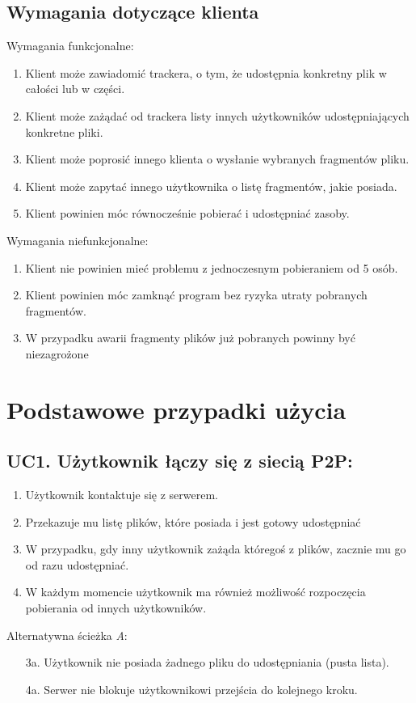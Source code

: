 \documentclass[11pt]{article}
\begin{document}
\subsection{Wymagania dotyczące klienta}
Wymagania funkcjonalne:
\begin{enumerate}
\item Klient może zawiadomić trackera, o tym, że udostępnia konkretny plik w całości lub w części.
\item Klient może zażądać od trackera listy innych użytkowników udostępniających konkretne pliki.
\item Klient może poprosić innego klienta o wysłanie wybranych fragmentów pliku.
\item Klient może zapytać innego użytkownika o listę fragmentów, jakie posiada.
\item Klient powinien móc równocześnie pobierać i udostępniać zasoby.
\end{enumerate}
Wymagania niefunkcjonalne:
\begin{enumerate}
\item Klient nie powinien mieć problemu z jednoczesnym pobieraniem od 5 osób.
\item Klient powinien móc zamknąć program bez ryzyka utraty pobranych fragmentów.
\item W przypadku awarii fragmenty plików już pobranych powinny być niezagrożone
\end{enumerate}

\section{Podstawowe przypadki użycia}
\subsection{UC1. Użytkownik łączy się z siecią P2P:}
\begin{enumerate}
	\item Użytkownik kontaktuje się z serwerem.
	\item Przekazuje mu listę plików, które posiada i jest gotowy udostępniać
	\item W przypadku, gdy inny użytkownik zażąda któregoś z plików, zacznie mu go od razu udostępniać.
	\item W każdym momencie użytkownik ma również możliwość rozpoczęcia pobierania od innych użytkowników.
\end{enumerate}
Alternatywna ścieżka \textsl{A}:
\begin{itemize}
	\item [3a.] Użytkownik nie posiada żadnego pliku do udostępniania (pusta lista).
	\item [4a.] Serwer nie blokuje użytkownikowi przejścia do kolejnego kroku.
\end{itemize}
\end{document}
